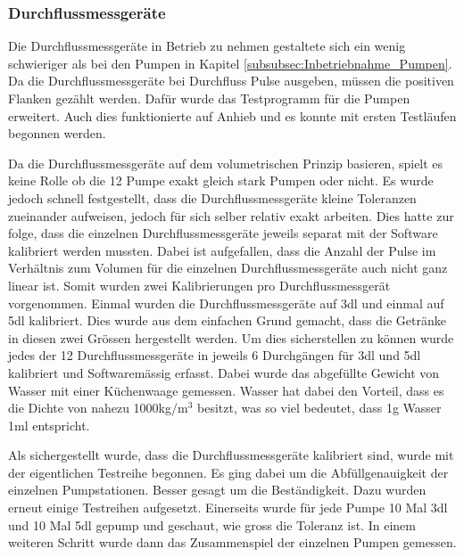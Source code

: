 \subsubsection{Durchflussmessgeräte}
\label{subsubsec:Inbetriebnahme_Durchflussmessgeräte}

Die Durchflussmessgeräte in Betrieb zu nehmen gestaltete sich ein wenig schwieriger als bei den Pumpen in Kapitel \ref{subsubsec:Inbetriebnahme_Pumpen}. Da die Durchflussmessgeräte bei Durchfluss Pulse ausgeben, müssen die positiven Flanken gezählt werden. Dafür wurde das Testprogramm für die Pumpen erweitert. Auch dies funktionierte auf Anhieb und es konnte mit ersten Testläufen begonnen werden. 

Da die Durchflussmessgeräte auf dem volumetrischen Prinzip basieren, spielt es keine Rolle ob die 12 Pumpe exakt gleich stark Pumpen oder nicht. Es wurde jedoch schnell festgestellt, dass die Durchflussmessgeräte kleine Toleranzen zueinander aufweisen, jedoch für sich selber relativ exakt arbeiten. Dies hatte zur folge, dass die einzelnen Durchflussmessgeräte jeweils separat mit der Software kalibriert werden mussten. Dabei ist aufgefallen, dass die Anzahl der Pulse im Verhältnis zum Volumen für die einzelnen Durchflussmessgeräte auch nicht ganz linear ist. Somit wurden zwei Kalibrierungen pro Durchflussmessgerät vorgenommen. Einmal wurden die Durchflussmessgeräte auf 3dl und einmal auf 5dl kalibriert. Dies wurde aus dem einfachen Grund gemacht, dass die Getränke in diesen zwei Grössen hergestellt werden. Um dies sicherstellen zu können wurde jedes der 12 Durchflussmessgeräte in jeweils 6 Durchgängen für 3dl und 5dl kalibriert und Softwaremässig erfasst. Dabei wurde das abgefüllte Gewicht von Wasser mit einer Küchenwaage gemessen. Wasser hat dabei den Vorteil, dass es die Dichte von nahezu 1000kg/m$^3$ besitzt, was so viel bedeutet, dass 1g Wasser 1ml entspricht. 


Als sichergestellt wurde, dass die Durchflussmessgeräte kalibriert sind, wurde mit der eigentlichen Testreihe begonnen. Es ging dabei um die Abfüllgenauigkeit der einzelnen Pumpstationen. Besser gesagt um die Beständigkeit. Dazu wurden erneut einige Testreihen aufgesetzt. Einerseits wurde für jede Pumpe 10 Mal 3dl und 10 Mal 5dl gepump und geschaut, wie gross die Toleranz ist. In einem weiteren Schritt wurde dann das Zusammenspiel der einzelnen Pumpen gemessen. 


